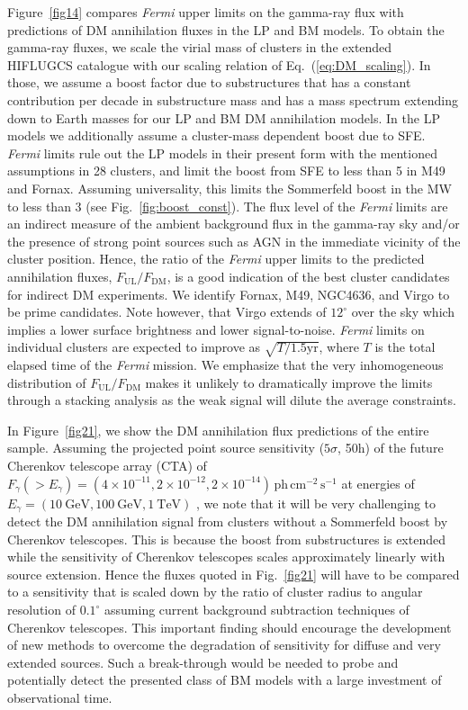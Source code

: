 \documentclass[10pt,aps,pra,reprint,amsmath,amsfonts,amssymb,showpacs,nofootinbib,floatfix]{revtex4-1}
\newcommand{\Fermi}{{\em Fermi}\xspace}
\newcommand{\rmn}{\mathrm}
\begin{document}
Figure~\ref{fig14} compares \Fermi upper limits on the gamma-ray flux
with predictions of DM annihilation fluxes in the LP and BM models.
To obtain the gamma-ray fluxes, we scale the virial mass of clusters
in the extended HIFLUGCS catalogue \cite{2007A&A...466..805C} with our
scaling relation of Eq.~(\ref{eq:DM_scaling}). In those, we assume a
boost factor due to substructures that has a constant contribution per
decade in substructure mass and has a mass spectrum extending down to
Earth masses for our LP and BM DM annihilation models. In the LP
models we additionally assume a cluster-mass dependent boost due to
SFE. \Fermi limits rule out the LP models in their present form with
the mentioned assumptions in 28 clusters, and limit the boost from SFE
to less than 5 in M49 and Fornax. Assuming universality, this limits
the Sommerfeld boost in the MW to less than 3 (see
Fig.~\ref{fig:boost_const}). The flux level of the \Fermi limits are
an indirect measure of the ambient background flux in the gamma-ray
sky and/or the presence of strong point sources such as AGN in the
immediate vicinity of the cluster position. Hence, the ratio of the
\Fermi upper limits to the predicted annihilation fluxes,
$F_{\mathrm{UL}}/F_{\mathrm{DM}}$, is a good indication of the best
cluster candidates for indirect DM experiments. We identify Fornax,
M49, NGC4636, and Virgo to be prime candidates. Note however, that
Virgo extends of $12^\circ$ over the sky which implies a lower surface
brightness and lower signal-to-noise. \Fermi limits on individual
clusters are expected to improve as $\sqrt{T/1.5 \mathrm{yr}}$, where
$T$ is the total elapsed time of the \Fermi mission. We emphasize that
the very inhomogeneous distribution of $F_{\mathrm{UL}}/
F_{\mathrm{DM}}$ makes it unlikely to dramatically improve the limits
through a stacking analysis as the weak signal will dilute the average
constraints.

In Figure~\ref{fig21}, we show the DM annihilation flux predictions of
the entire sample. Assuming the projected point source sensitivity
($5\sigma$, 50h) of the future Cherenkov telescope array (CTA) of
$F_\gamma(>E_\gamma) = (4\times10^{-11}, 2\times10^{-12},
2\times10^{-14})\,\rmn{ph}\,\rmn{cm}^{-2}\,\rmn{s}^{-1}$ at energies
of $E_\gamma=(10~\rmn{GeV}, 100~\rmn{GeV}, 1~\rmn{TeV})$
\cite{Doro:2009qs}, we note that it will be very challenging to detect
the DM annihilation signal from clusters without a Sommerfeld boost by
Cherenkov telescopes. This is because the boost from substructures is
extended while the sensitivity of Cherenkov telescopes scales
approximately linearly with source extension. Hence the fluxes
quoted in Fig.~\ref{fig21} will have to be compared to a sensitivity
that is scaled down by the ratio of cluster radius to angular
resolution of $0.1^\circ$ assuming current background subtraction
techniques of Cherenkov telescopes. This important finding should
encourage the development of new methods to overcome the degradation
of sensitivity for diffuse and very extended sources. Such a
break-through would be needed to probe and potentially detect the
presented class of BM models with a large investment of observational
time.
\end{document}
